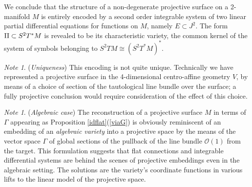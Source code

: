 \documentclass[11pt]{article}
\numberwithin{equation}{section}
\newcounter{count}
\theoremstyle{plain}
\theoremstyle{remark}
\newtheorem{note}[count]{Note}
\renewcommand{\P}{\mathbb{P}}
\newcommand{\GL}{GL}
\newcommand{\R}{\mathbb{R}}
\newcommand{\II}{\textnormal{II}}
\begin{document}


We conclude that the structure of a non-degenerate projective surface on a 2-manifold $M$ is entirely encoded by a second order integrable system of two linear partial differential equations for functions on $M$, namely $E\subset J^{2}$. The form $\II\subset S^{2}T^{*}M$ is revealed to be its characteristic variety, the common kernel of the system of symbols belonging to $S^{2}TM\cong (S^{2}T^*M)^{*}$.

\begin{note}(\emph{Uniqueness}) This encoding is not quite unique. Technically we have represented a projective surface in the 4-dimensional centro-affine geometry $V$, by means of a choice of section of the tautological line bundle over the surface; a fully projective conclusion would require consideration of the effect of this choice.
\end{note}

\begin{note}(\emph{Algebraic case}) The reconstruction of a projective surface $M$ in terms of $\Gamma$ appearing as Proposition \ref{idflat}(\ref{viaG}) is obviously reminiscent of an embedding of an \emph{algebraic variety} into a projective space by the means of the vector space $\Gamma$ of global sections of the pullback of the line bundle $\mathcal{O}(1)$ from the target. This formulation suggests that flat connections and integrable differential systems are behind the scenes of projective embeddings even in the algebraic setting. The solutions are the variety's coordinate functions in various lifts to the linear model of the projective space.
\end{note}
\end{document}
